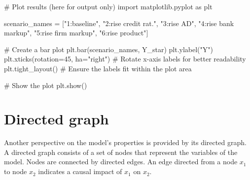 \documentclass[
  letterpaper,
  DIV=11,
  numbers=noendperiod]{scrreprt}
\newenvironment{Shaded}{\begin{snugshade}}{\end{snugshade}}
\newcommand{\CommentTok}[1]{\textcolor[rgb]{0.37,0.37,0.37}{#1}}
\newcommand{\DecValTok}[1]{\textcolor[rgb]{0.68,0.00,0.00}{#1}}
\newcommand{\ImportTok}[1]{\textcolor[rgb]{0.00,0.46,0.62}{#1}}
\newcommand{\NormalTok}[1]{\textcolor[rgb]{0.00,0.23,0.31}{#1}}
\newcommand{\OperatorTok}[1]{\textcolor[rgb]{0.37,0.37,0.37}{#1}}
\newcommand{\StringTok}[1]{\textcolor[rgb]{0.13,0.47,0.30}{#1}}
\begin{document}
\begin{tcolorbox}[enhanced jigsaw, titlerule=0mm, breakable, bottomrule=.15mm, toprule=.15mm, colbacktitle=quarto-callout-note-color!10!white, rightrule=.15mm, toptitle=1mm, opacityback=0, left=2mm, coltitle=black, title=\textcolor{quarto-callout-note-color}{\faInfo}\hspace{0.5em}{Python code}, colframe=quarto-callout-note-color-frame, opacitybacktitle=0.6, leftrule=.75mm, bottomtitle=1mm, arc=.35mm, colback=white]

\begin{Shaded}
\begin{Highlighting}[]
\CommentTok{\# Plot results (here for output only)}
\ImportTok{import}\NormalTok{ matplotlib.pyplot }\ImportTok{as}\NormalTok{ plt}

\NormalTok{scenario\_names }\OperatorTok{=}\NormalTok{ [}\StringTok{"1:baseline"}\NormalTok{, }\StringTok{"2:rise credit rat."}\NormalTok{, }\StringTok{"3:rise AD"}\NormalTok{, }\StringTok{"4:rise bank markup"}\NormalTok{, }\StringTok{"5:rise firm markup"}\NormalTok{, }\StringTok{"6:rise product"}\NormalTok{]}

\CommentTok{\# Create a bar plot}
\NormalTok{plt.bar(scenario\_names, Y\_star)}
\NormalTok{plt.ylabel(}\StringTok{"Y"}\NormalTok{)}
\NormalTok{plt.xticks(rotation}\OperatorTok{=}\DecValTok{45}\NormalTok{, ha}\OperatorTok{=}\StringTok{"right"}\NormalTok{)  }\CommentTok{\# Rotate x{-}axis labels for better readability}
\NormalTok{plt.tight\_layout()  }\CommentTok{\# Ensure the labels fit within the plot area}

\CommentTok{\# Show the plot}
\NormalTok{plt.show()}
\end{Highlighting}
\end{Shaded}

\end{tcolorbox}

\section{Directed graph}\label{directed-graph-3}

Another perspective on the model's properties is provided by its
directed graph. A directed graph consists of a set of nodes that
represent the variables of the model. Nodes are connected by directed
edges. An edge directed from a node \(x_1\) to node \(x_2\) indicates a
causal impact of \(x_1\) on \(x_2\).
\end{document}
